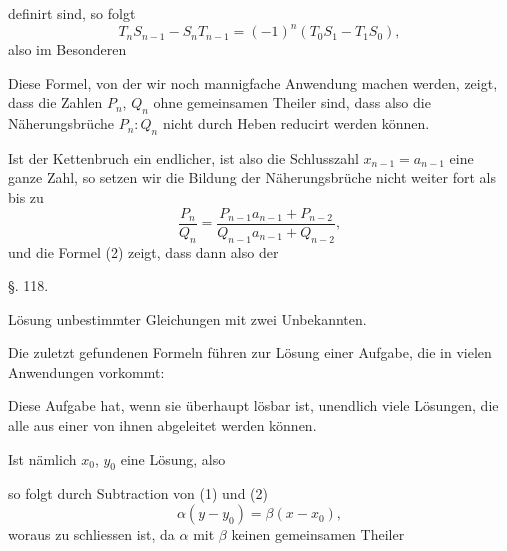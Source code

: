 definirt sind, so folgt
\[
T_n S_{n-1} - S_n T_{n-1} = (-1)^n (T_0 S_1 - T_1 S_0),
\]
also im Besonderen


Diese Formel, von der wir noch mannigfache Anwendung machen werden, zeigt, dass die Zahlen $P_n$, $Q_n$ ohne gemeinsamen Theiler sind, dass also die Näherungsbrüche $P_n : Q_n$ nicht durch Heben reducirt werden können.

Ist der Kettenbruch ein endlicher, ist also die Schlusszahl $x_{n-1} = a_{n-1}$ eine ganze Zahl, so setzen wir die Bildung der Näherungsbrüche nicht weiter fort als bis zu
\[
\frac{P_n}{Q_n} = \frac{P_{n-1} a_{n-1} + P_{n-2}}{Q_{n-1} a_{n-1} + Q_{n-2}},
\]
und die Formel (2) zeigt, dass dann also der 

\begin{center}
§. 118.

Lösung unbestimmter Gleichungen mit zwei Unbekannten.
\end{center}

Die zuletzt gefundenen Formeln führen zur Lösung einer Aufgabe, die in vielen Anwendungen vorkommt:



Diese Aufgabe hat, wenn sie überhaupt lösbar ist, unendlich viele Lösungen, die alle aus einer von ihnen abgeleitet werden können.

Ist nämlich $x_0$, $y_0$ eine Lösung, also

so folgt durch Subtraction von (1) und (2)
\[
\alpha (y - y_0) = \beta (x - x_0),
\]
woraus zu schliessen ist, da $\alpha$ mit $\beta$ keinen gemeinsamen Theiler

